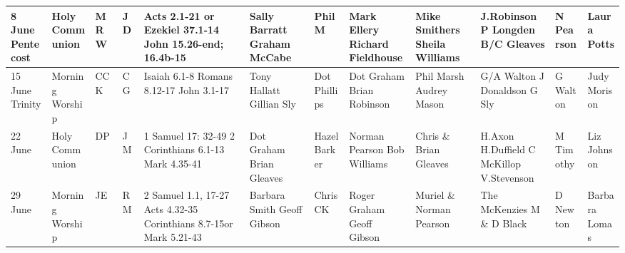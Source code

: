 \documentclass[10pt,a4paper]{article}
\begin{document}
\begin{center}
{\begin{tabular}{|p{1.6cm}|p{1.4cm}|p{0.6cm}|p{0.6cm}|p{3.2cm}|p{2cm}|p{1.5cm}|p{2cm}|p{2.0cm}|p{2.4cm}
|p{1.6cm}|p{1.6cm}|}
 8 June \linebreak Pentecost & Holy Communion &  MRW & JD & %
 Acts 2.1-21 or Ezekiel 37.1-14
John 15.26-end; 16.4b-15
 & Sally Barratt Graham McCabe  & Phil M &
Mark Ellery Richard Fieldhouse & Mike Smithers Sheila Williams & 
J.Robinson \linebreak P Longden  \linebreak B/C Gleaves
  &  N Pearson   & Laura Potts \\ \hline
15 June  Trinity & Morning Worship   & CCK  & CG  & 
Isaiah 6.1-8
Romans 8.12-17 \linebreak
John 3.1-17
& 
Tony Hallatt Gillian Sly & Dot Phillips &
Dot Graham Brian Robinson &  Phil Marsh Audrey Mason & 
G/A Walton  \linebreak J Donaldson  \linebreak G Sly
 &  G Walton & Judy \linebreak Morison  \\ 
\hline
22 June  & Holy Communion & DP  & JM &
1 Samuel 17: 32-49
2 Corinthians 6.1-13
Mark 4.35-41
& Dot Graham Brian Gleaves  &  Hazel Barker & Norman Pearson \linebreak Bob Williams & 
Chris \& \linebreak Brian Gleaves   & 
 H.Axon  \linebreak H.Duffield   C McKillop    V.Stevenson
&  M Timothy &  Liz Johnson \\
\hline %
29 June & Morning Worship
 & JE & RM & 
2 Samuel 1.1, 17-27 
Acts 4.32-35
\linebreak 2 Corinthians 8.7-15\linebreak or %
Mark 5.21-43
&  
Barbara Smith Geoff Gibson  & 
Chris CK  & Roger Graham Geoff Gibson & 
Muriel \& Norman Pearson  &
The Mc\-Kenzies M \& D Black
 & D Newton & Barbara \linebreak Lomas \\
\hline

\end{tabular}}
\end{center}
\end{document}
